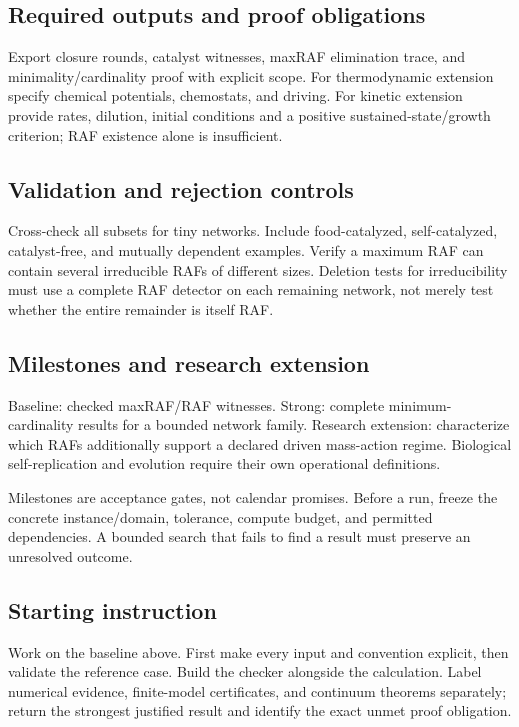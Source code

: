 \documentclass[
  11pt,
]{article}
\begin{document}
\subsection{Required outputs and proof obligations}

Export closure rounds, catalyst witnesses, maxRAF elimination trace, and
minimality/cardinality proof with explicit scope. For thermodynamic
extension specify chemical potentials, chemostats, and driving. For
kinetic extension provide rates, dilution, initial conditions and a
positive sustained-state/growth criterion; RAF existence alone is
insufficient.

\subsection{Validation and rejection controls}

Cross-check all subsets for tiny networks. Include food-catalyzed,
self-catalyzed, catalyst-free, and mutually dependent examples. Verify a
maximum RAF can contain several irreducible RAFs of different sizes.
Deletion tests for irreducibility must use a complete RAF detector on
each remaining network, not merely test whether the entire remainder is
itself RAF.

\subsection{Milestones and research extension}

Baseline: checked maxRAF/RAF witnesses. Strong: complete
minimum-cardinality results for a bounded network family. Research
extension: characterize which RAFs additionally support a declared
driven mass-action regime. Biological self-replication and evolution
require their own operational definitions.

Milestones are acceptance gates, not calendar promises. Before a run,
freeze the concrete instance/domain, tolerance, compute budget, and
permitted dependencies. A bounded search that fails to find a result
must preserve an unresolved outcome.

\subsection{Starting instruction}

Work on the baseline above. First make every input and convention
explicit, then validate the reference case. Build the checker alongside
the calculation. Label numerical evidence, finite-model certificates,
and continuum theorems separately; return the strongest justified result
and identify the exact unmet proof obligation.
\end{document}
